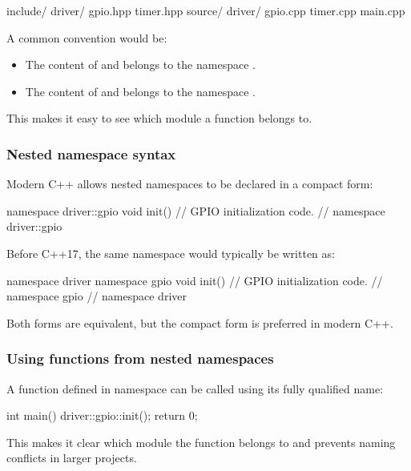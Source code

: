\begin{console}
include/
    driver/
        gpio.hpp
        timer.hpp
source/
    driver/
        gpio.cpp
        timer.cpp
    main.cpp
\end{console}

\noindent A common convention would be:
\begin{itemize}
  \item The content of  and  belongs to the namespace
    .
  \item The content of  and  belongs to the namespace
    .
\end{itemize}
This makes it easy to see which module a function belongs to.

\subsubsection{Nested namespace syntax}
Modern C++ allows nested namespaces to be declared in a compact form:

\begin{cppcode}
namespace driver::gpio
{
void init()
{
    // GPIO initialization code.
}
} // namespace driver::gpio
\end{cppcode}

\noindent Before C++17, the same namespace would typically be written as:

\begin{cppcode}
namespace driver
{
namespace gpio
{
void init()
{
    // GPIO initialization code.
}
} // namespace gpio
} // namespace driver
\end{cppcode}

\noindent Both forms are equivalent, but the compact form is preferred in modern C++.

\subsubsection{Using functions from nested namespaces}
A function defined in namespace  can be called using its fully qualified name:

\begin{cppcode}
int main()
{
    driver::gpio::init();
    return 0;
}
\end{cppcode}

\noindent This makes it clear which module the function belongs to and prevents naming conflicts
in larger projects.

